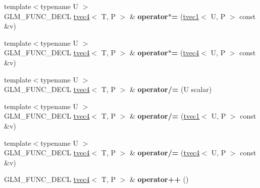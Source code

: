 \begin{DoxyCompactItemize}
\mbox{\label{structglm_1_1tvec4_a88ce896b3a895723b122b7499263c29f}} 
{\footnotesize template$<$typename U $>$ }\\G\+L\+M\+\_\+\+F\+U\+N\+C\+\_\+\+D\+E\+CL \hyperlink{structglm_1_1tvec4}{tvec4}$<$ T, P $>$ \& {\bfseries operator$\ast$=} (\hyperlink{structglm_1_1tvec1}{tvec1}$<$ U, P $>$ const \&v)
\item 
\mbox{\label{structglm_1_1tvec4_af42a89aec5ba8557af8f45829d4d52e0}} 
{\footnotesize template$<$typename U $>$ }\\G\+L\+M\+\_\+\+F\+U\+N\+C\+\_\+\+D\+E\+CL \hyperlink{structglm_1_1tvec4}{tvec4}$<$ T, P $>$ \& {\bfseries operator$\ast$=} (\hyperlink{structglm_1_1tvec4}{tvec4}$<$ U, P $>$ const \&v)
\item 
\mbox{\label{structglm_1_1tvec4_a9db36befe0fef144842aa4b1097a953c}} 
{\footnotesize template$<$typename U $>$ }\\G\+L\+M\+\_\+\+F\+U\+N\+C\+\_\+\+D\+E\+CL \hyperlink{structglm_1_1tvec4}{tvec4}$<$ T, P $>$ \& {\bfseries operator/=} (U scalar)
\item 
\mbox{\label{structglm_1_1tvec4_a617a3db69dfecb4f10bf7199eaf8e071}} 
{\footnotesize template$<$typename U $>$ }\\G\+L\+M\+\_\+\+F\+U\+N\+C\+\_\+\+D\+E\+CL \hyperlink{structglm_1_1tvec4}{tvec4}$<$ T, P $>$ \& {\bfseries operator/=} (\hyperlink{structglm_1_1tvec1}{tvec1}$<$ U, P $>$ const \&v)
\item 
\mbox{\label{structglm_1_1tvec4_ad00994666628d9c12846b274ba3a16a1}} 
{\footnotesize template$<$typename U $>$ }\\G\+L\+M\+\_\+\+F\+U\+N\+C\+\_\+\+D\+E\+CL \hyperlink{structglm_1_1tvec4}{tvec4}$<$ T, P $>$ \& {\bfseries operator/=} (\hyperlink{structglm_1_1tvec4}{tvec4}$<$ U, P $>$ const \&v)
\item 
\mbox{\label{structglm_1_1tvec4_a63ee9187003ff40cb781a3cf3959475f}} 
G\+L\+M\+\_\+\+F\+U\+N\+C\+\_\+\+D\+E\+CL \hyperlink{structglm_1_1tvec4}{tvec4}$<$ T, P $>$ \& {\bfseries operator++} ()
\item 
\mbox{\label{structglm_1_1tvec4_acf7152ff69c44483a6dcaa29926d25a3}} 

\end{DoxyCompactItemize}
